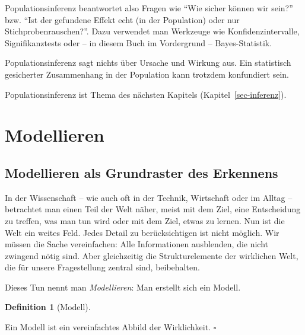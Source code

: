 \documentclass[
  ngerman,
  letterpaper,
  twoside,
  open=any]{scrbook}
\theoremstyle{definition}
\theoremstyle{plain}
\theoremstyle{definition}
\theoremstyle{definition}
\newtheorem{definition}{Definition}[chapter]
\theoremstyle{definition}
\theoremstyle{definition}
\theoremstyle{remark}
\begin{document}
Populationsinferenz beantwortet also Fragen wie \enquote{Wie sicher
können wir sein?} bzw. \enquote{Ist der gefundene Effekt echt (in der
Population) oder nur Stichprobenrauschen?}. Dazu verwendet man Werkzeuge
wie Konfidenzintervalle, Signifikanztests oder -- in diesem Buch im
Vordergrund -- Bayes-Statistik.

\begin{tcolorbox}[enhanced jigsaw, arc=.35mm, bottomrule=.15mm, bottomtitle=1mm, breakable, colback=white, colbacktitle=quarto-callout-important-color!10!white, colframe=quarto-callout-important-color-frame, coltitle=black, left=2mm, leftrule=.75mm, opacityback=0, opacitybacktitle=0.6, rightrule=.15mm, title=\textcolor{quarto-callout-important-color}{\faExclamation}\hspace{0.5em}{Wichtig}, titlerule=0mm, toprule=.15mm, toptitle=1mm]

Populationsinferenz sagt nichts über Ursache und Wirkung aus. Ein
statistisch gesicherter Zusammenhang in der Population kann trotzdem
konfundiert sein.

\end{tcolorbox}

Populationsinferenz ist Thema des nächsten Kapitels
(Kapitel~\ref{sec-inferenz}).

\section{Modellieren}\label{modellieren}

\subsection{Modellieren als Grundraster des
Erkennens}\label{modellieren-als-grundraster-des-erkennens}

In der Wissenschaft -- wie auch oft in der Technik, Wirtschaft oder im
Alltag -- betrachtet man einen Teil der Welt näher, meist mit dem Ziel,
eine Entscheidung zu treffen, was man tun wird oder mit dem Ziel, etwas
zu lernen. Nun ist die Welt ein weites Feld. Jedes Detail zu
berücksichtigen ist nicht möglich. Wir müssen die Sache vereinfachen:
Alle Informationen ausblenden, die nicht zwingend nötig sind. Aber
gleichzeitig die Strukturelemente der wirklichen Welt, die für unsere
Fragestellung zentral sind, beibehalten.

Dieses Tun nennt man \emph{Modellieren}: Man erstellt sich ein Modell.

\begin{definition}[Modell]\protect\hypertarget{def-model}{}\label{def-model}

Ein Modell ist ein vereinfachtes Abbild der Wirklichkeit. \(\square\)

\end{definition}
\end{document}
